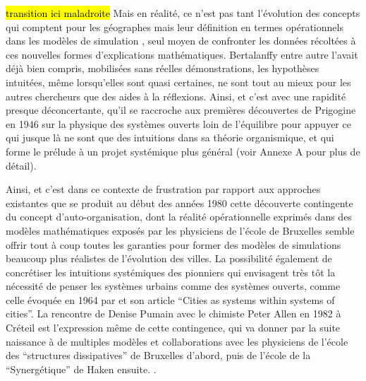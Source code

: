 \hl{transition ici maladroite}
Mais en réalité, ce n'est pas tant l'évolution des concepts qui comptent pour les géographes mais leur définition en termes opérationnels dans les modèles de simulation \autocite{Pumain2003}, seul moyen de confronter les données récoltées à ces nouvelles formes d'explications mathématiques. Bertalanffy entre autre l'avait déjà bien compris, mobilisées sans réelles démonstrations, les hypothèses intuitées, même lorsqu'elles sont quasi certaines, ne sont tout au mieux pour les autres chercheurs que des aides à la réflexions. Ainsi, et c'est avec une rapidité presque déconcertante, qu'il se raccroche aux premières découvertes de Prigogine en 1946 sur la physique des systèmes ouverts loin de l'équilibre pour appuyer ce qui jusque là ne sont que des intuitions dans sa théorie organismique, et qui forme le prélude à un projet systémique plus général (voir Annexe A pour plus de détail).

Ainsi, et c'est dans ce contexte de frustration par rapport aux approches existantes  que se produit au début des années 1980 cette découverte contingente du concept d'auto-organisation, dont la réalité opérationnelle exprimés dans des modèles mathématiques exposés par les physiciens de l'école de Bruxelles semble offrir tout à coup toutes les garanties pour former des modèles de simulations beaucoup plus réalistes de l'évolution des villes.  \autocite[350]{Pumain1998a} La possibilité également de concrétiser les intuitions systémiques des pionniers qui envisagent très tôt la nécessité de penser les systèmes urbains comme des systèmes ouverts, comme celle évoquée en 1964 par \textcite{Berry1964a} et son article \enquote{Cities as systems within systems of cities}. La rencontre de Denise Pumain avec le chimiste  Peter Allen en 1982 à Créteil  est l'expression même de cette contingence, qui va donner par la suite naissance à de multiples modèles et collaborations avec les physiciens de l'école des \enquote{structures dissipatives} de Bruxelles d'abord, puis de l'école de la \enquote{Synergétique} de Haken ensuite. \autocites[27]{Pumain2003}{Pumain1982b, Schmid2014}.

